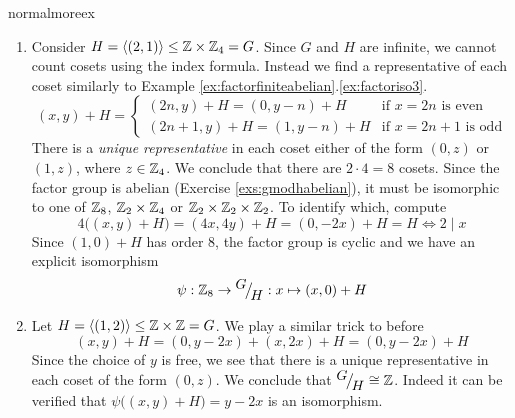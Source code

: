 \begin{examples}{}{normalmoreex}
\begin{enumerate}
	  
	  \item Consider $H=\left\langle (2,1)\right\rangle\le\mathbb{Z}\times\mathbb{Z}_4=G$. Since $G$ and $H$ are infinite, we cannot count cosets using the index formula. Instead we find a representative of each coset similarly to Example \ref*{ex:factorfiniteabelian}.\ref{ex:factoriso3}.
	  \[
	  	(x,y)+H=
	  	\begin{cases}
	  		(2n,y)+H=(0,y-n)+H&\text{if $x=2n$ is even}\\
	  		(2n+1,y)+H=(1,y-n)+H&\text{if $x=2n+1$ is odd}
	  	\end{cases}
	  \]
	  There is a \emph{unique representative} in each coset either of the form $(0,z)$ or $(1,z)$, where $z\in\mathbb{Z}_4$. We conclude that there are $2\cdot 4=8$ cosets. Since the factor group is abelian (Exercise \ref{exs:gmodhabelian}), it must be isomorphic to one of $\mathbb{Z}_8$, $\mathbb{Z}_2\times\mathbb{Z}_4$ or $\mathbb{Z}_2\times\mathbb{Z}_2\times\mathbb{Z}_2$. To identify which, compute
	  \[
	  	4\bigl((x,y)+H\bigr)=(4x,4y)+H=(0,-2x)+H=H \iff 2\mid x
	  \]
	  Since $(1,0)+H$ has order 8, the factor group is cyclic and we have an explicit isomorphism
	  \[
	  	\psi:\mathbb{Z}_8\to{}^{\textstyle {G}}\!\big/_{\textstyle \!{H}}:x\mapsto (x,0)+H
	  \]
	  
	  \item\label{ex:hardgmodh} Let $H=\left\langle (1,2)\right\rangle\le\mathbb{Z}\times\mathbb{Z}=G$. We play a similar trick to before
	  \[
	  	(x,y)+H =(0,y-2x)+(x,2x)+H =(0,y-2x)+H
	  \]
	  Since the choice of $y$ is free, we see that there is a unique representative in each coset of the form $(0,z)$. We conclude that ${}^{\textstyle {G}}\!\big/_{\textstyle \!{H}}\cong\mathbb{Z}$. Indeed it can be verified that $\psi\bigl((x,y)+H\bigr)=y-2x$ is an isomorphism. 
	
		

\end{enumerate}
\end{examples}
